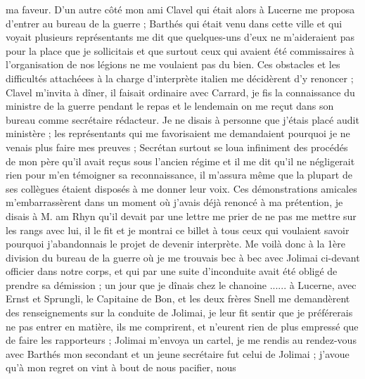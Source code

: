 \documentclass[12pt]{article}
\begin{document}
 ma faveur. D’un autre côté mon ami Clavel qui était
alors à Lucerne me proposa d’entrer au bureau de la guerre ; Barthés qui était venu dans cette ville
et qui voyait plusieurs représentants me dit que quelques-uns d’eux ne m’aideraient pas pour la
place que je sollicitais et que surtout ceux qui avaient été commissaires à l’organisation de nos
légions ne me voulaient pas du bien. Ces obstacles et les difficultés attachéees à la charge
d’interprète italien me décidèrent d’y renoncer ; Clavel m’invita à dîner, il faisait ordinaire avec
Carrard, je fis la connaissance du ministre de la guerre pendant le repas et le lendemain on me
reçut dans son bureau comme secrétaire rédacteur. Je ne disais à personne que j’étais placé audit
ministère ; les représentants qui me favorisaient me demandaient pourquoi je ne venais plus faire
mes preuves ; Secrétan surtout se loua infiniment des procédés de mon père qu’il avait reçus sous
l’ancien régime et il me dit qu’il ne négligerait rien pour m’en témoigner sa reconnaissance, il
m’assura même que la plupart de ses collègues étaient disposés à me donner leur voix. Ces
démonstrations amicales m’embarrassèrent dans un moment où j’avais déjà renoncé à ma prétention, je
disais à M. am Rhyn qu’il devait par une lettre me prier de ne pas me mettre sur les rangs avec lui,
il le fit et je montrai ce billet à tous ceux qui voulaient savoir pourquoi j’abandonnais le projet
de devenir interprète. Me voilà donc à la 1ère division du bureau de la guerre où je me trouvais bec
à bec avec Jolimai ci-devant officier dans notre corps, et qui par une suite d’inconduite avait été
obligé de prendre sa démission ; un jour que je dînais chez le chanoine ...... à Lucerne, avec Ernst
et Sprungli, le Capitaine de Bon, et les deux frères Snell me demandèrent des renseignements sur la
conduite de Jolimai, je leur fit sentir que je préférerais ne pas entrer en matière, ils me
comprirent, et n’eurent rien de plus empressé que de faire les rapporteurs ; Jolimai m’envoya un
cartel, je me rendis au rendez-vous avec Barthés mon secondant et un jeune secrétaire fut celui de
Jolimai ; j’avoue qu’à mon regret on vint à bout de nous pacifier, nous
\end{document}
